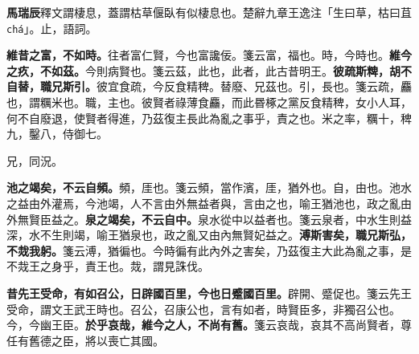 \begin{quoting}\textbf{馬瑞辰}釋文謂棲息，蓋謂枯草偃臥有似棲息也。楚辭九章王逸注「生曰草，枯曰苴 \texttt{chá}」。止，語詞。\end{quoting}

\textbf{維昔之富，不如時。}{\footnotesize 往者富仁賢，今也富讒佞。箋云富，福也。時，今時也。}\textbf{維今之疚，不如茲。}{\footnotesize 今則病賢也。箋云茲，此也，此者，此古昔明王。}\textbf{彼疏斯粺，胡不自替，職兄斯引。}{\footnotesize 彼宜食疏，今反食精稗。替廢、兄茲也。引，長也。箋云疏，麤也，謂糲米也。職，主也。彼賢者祿薄食麤，而此昬椓之黨反食精稗，女小人耳，何不自廢退，使賢者得進，乃茲復主長此為亂之事乎，責之也。米之率，糲十，稗九，鑿八，侍御七。}

\begin{quoting}兄，同況。\end{quoting}

\textbf{池之竭矣，不云自頻。}{\footnotesize 頻，厓也。箋云頻，當作濱，厓，猶外也。自，由也。池水之益由外灌焉，今池竭，人不言由外無益者與，言由之也，喻王猶池也，政之亂由外無賢臣益之。}\textbf{泉之竭矣，不云自中。}{\footnotesize 泉水從中以益者也。箋云泉者，中水生則益深，水不生則竭，喻王猶泉也，政之亂又由內無賢妃益之。}\textbf{溥斯害矣，職兄斯弘，不烖我躬。}{\footnotesize 箋云溥，猶徧也。今時徧有此內外之害矣，乃茲復主大此為亂之事，是不烖王之身乎，責王也。烖，謂見誅伐。}

\textbf{昔先王受命，有如召公，日辟國百里，今也日蹙國百里。}{\footnotesize 辟開、蹙促也。箋云先王受命，謂文王武王時也。召公，召康公也，言有如者，時賢臣多，非獨召公也。今，今幽王臣。}\textbf{於乎哀哉，維今之人，不尚有舊。}{\footnotesize 箋云哀哉，哀其不高尚賢者，尊任有舊德之臣，將以喪亡其國。}

